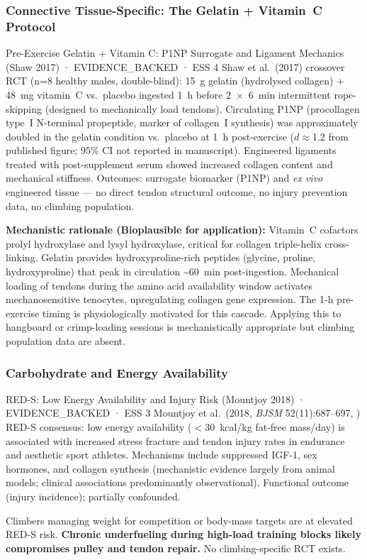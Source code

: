 \subsubsection*{Connective Tissue-Specific: The Gelatin + Vitamin~C Protocol}

\begin{evidencebox}{Pre-Exercise Gelatin + Vitamin C: P1NP Surrogate and Ligament Mechanics (Shaw 2017) · EVIDENCE\_BACKED · ESS 4}
Shaw et al.\ (2017) crossover RCT (n=8 healthy males, double-blind): 15~g gelatin (hydrolysed collagen) + 48~mg vitamin~C vs.\ placebo ingested 1~h before 2~$\times$~6~min intermittent rope-skipping (designed to mechanically load tendons). Circulating P1NP (procollagen type~I N-terminal propeptide, marker of collagen~I synthesis) was approximately doubled in the gelatin condition vs.\ placebo at 1~h post-exercise ($d\approx$1.2 from published figure; 95\% CI not reported in manuscript). Engineered ligaments treated with post-supplement serum showed increased collagen content and mechanical stiffness. Outcomes: surrogate biomarker (P1NP) and \emph{ex vivo} engineered tissue --- no direct tendon structural outcome, no injury prevention data, no climbing population. \cite{SLRE17}

\textbf{Mechanistic rationale (Bioplausible for application):} Vitamin~C cofactors prolyl hydroxylase and lysyl hydroxylase, critical for collagen triple-helix cross-linking. Gelatin provides hydroxyproline-rich peptides (glycine, proline, hydroxyproline) that peak in circulation \textasciitilde{}60~min post-ingestion. Mechanical loading of tendons during the amino acid availability window activates mechanosensitive tenocytes, upregulating collagen gene expression. The 1-h pre-exercise timing is physiologically motivated for this cascade. Applying this to hangboard or crimp-loading sessions is mechanistically appropriate but climbing population data are absent.
\end{evidencebox}

\subsubsection*{Carbohydrate and Energy Availability}

\begin{evidencebox}{RED-S: Low Energy Availability and Injury Risk (Mountjoy 2018) · EVIDENCE\_BACKED · ESS 3}
Mountjoy et al.\ (2018, \emph{BJSM} 52(11):687--697, \cite{MSBE18}) RED-S consensus: low energy availability ($<$30~kcal/kg fat-free mass/day) is associated with increased stress fracture and tendon injury rates in endurance and aesthetic sport athletes. Mechanisms include suppressed IGF-1, sex hormones, and collagen synthesis (mechanistic evidence largely from animal models; clinical associations predominantly observational). Functional outcome (injury incidence); partially confounded.

Climbers managing weight for competition or body-mass targets are at elevated RED-S risk. \textbf{Chronic underfueling during high-load training blocks likely compromises pulley and tendon repair.} No climbing-specific RCT exists.
\end{evidencebox}

